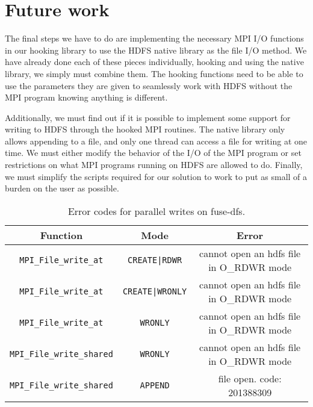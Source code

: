 \documentclass[11pt,titlepage]{article}
\newcommand{\otoprule}{\midrule[\heavyrulewidth]}
\begin{document}
\section{Future work}
The final steps we have to do are implementing the necessary MPI I/O functions
in our hooking library to 
use the HDFS native library as the file I/O method. We have already done each of
these pieces 
individually, hooking and using the native library, we simply must combine them.
The hooking functions 
need to be able to use the parameters they are given to seamlessly work with
HDFS without the MPI 
program knowing anything is different. 

Additionally, we must find out if it is possible to implement some support for
writing to HDFS through 
the hooked MPI routines. The native library only allows appending to a file, and
only one thread can 
access a file for writing at one time. We must either modify the behavior of the
I/O of the MPI program 
or set restrictions on what MPI programs running on HDFS are allowed to do.
Finally, we must simplify 
the scripts required for our solution to work to put as small of a burden on the
user as possible.

\begin{table}[t]
	\centering
	\small
	\begin{tabular}{ccc}
		\toprule
	{\bf Function} &{\bf Mode} &{\bf Error} \\\otoprule
		{\tt MPI\_File\_write\_at} & {\tt CREATE|RDWR} & cannot open an
		hdfs file in O\_RDWR mode \\
		{\tt MPI\_File\_write\_at} & {\tt CREATE|WRONLY} & cannot open an
		hdfs file in O\_RDWR mode \\
		{\tt MPI\_File\_write\_at} & {\tt WRONLY} & cannot open an
		hdfs file in O\_RDWR mode \\
		{\tt MPI\_File\_write\_shared} & {\tt WRONLY} & cannot open an
		hdfs file in O\_RDWR mode \\
		{\tt MPI\_File\_write\_shared} & {\tt APPEND} &file open. code:
		201388309\\\bottomrule 
	\end{tabular}
	\caption{\small Error codes for parallel writes on fuse-dfs.}
	\label{tab:write}
\end{table}
{}

\end{document}
